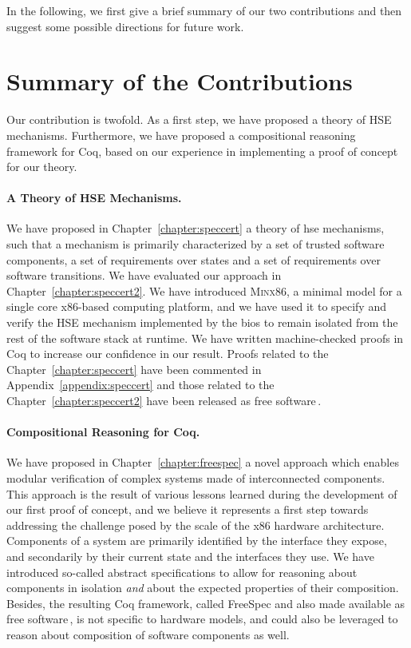 In the following, we first give a brief summary of our two contributions and
then suggest some possible directions for future work.

\section{Summary of the Contributions}
\label{sec:conclusion:summary}

Our contribution is twofold.
%
As a first step, we have proposed a theory of HSE mechanisms.
%
Furthermore, we have proposed a compositional reasoning framework for Coq, based
on our experience in implementing a proof of concept for our theory.

\paragraph{A Theory of HSE Mechanisms.}
%
We have proposed in Chapter~\ref{chapter:speccert} a theory of \ac{hse}
mechanisms, such that a mechanism is primarily characterized by a set of trusted
software components, a set of requirements over states and a set of requirements
over software transitions.
%
We have evaluated our approach in Chapter~\ref{chapter:speccert2}.
%
We have introduced {\scshape Minx86}, a minimal model for a single core
x86-based computing platform, and we have used it to specify and verify the HSE
mechanism implemented by the \ac{bios} to remain isolated from the rest of the
software stack at runtime.
%
We have written machine-checked proofs in Coq to increase our confidence in our
result.
%
Proofs related to the Chapter~\ref{chapter:speccert} have been commented in
Appendix~\ref{appendix:speccert} and those related to the
Chapter~\ref{chapter:speccert2} have been released as free
software\,\cite{letan2016speccertcode}.

\paragraph{Compositional Reasoning for Coq.}
%
We have proposed in Chapter~\ref{chapter:freespec} a novel approach which
enables modular verification of complex systems made of interconnected
components.
%
This approach is the result of various lessons learned during the development of
our first proof of concept, and we believe it represents a first step towards
addressing the challenge posed by the scale of the x86 hardware architecture.
%
Components of a system are primarily identified by the interface they expose,
and secondarily by their current state and the interfaces they use.
%
We have introduced so-called abstract specifications to allow for reasoning
about components in isolation \emph{and} about the expected properties of their
composition.
%
Besides, the resulting Coq framework, called FreeSpec and also made available as
free software\,\cite{letan2018freespeccode}, is not specific to hardware models,
and could also be leveraged to reason about composition of software components
as well.

